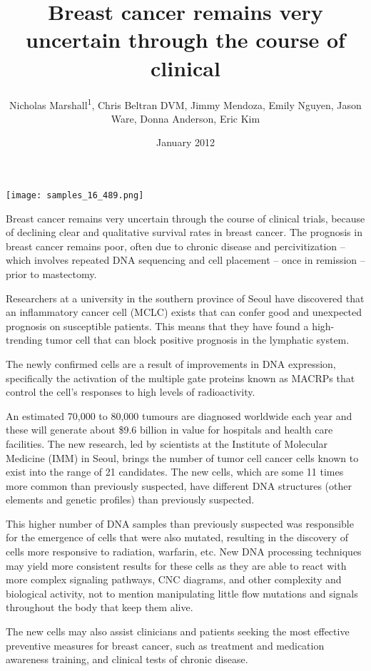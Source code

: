 \documentclass{article}
\title{Breast cancer remains very uncertain through the course of clinical}
\author{Nicholas Marshall\textsuperscript{1},  Chris Beltran DVM,  Jimmy Mendoza,  Emily Nguyen,  Jason Ware,  Donna Anderson,  Eric Kim}
\affil{\textsuperscript{1}Ewha Womans University}
\date{January 2012}
\begin{document}
\maketitle

\begin{center}
\begin{minipage}{0.75\linewidth}
\texttt{[image: samples\_16\_489.png]}
\end{minipage}
\end{center}

Breast cancer remains very uncertain through the course of clinical trials, because of declining clear and qualitative survival rates in breast cancer. The prognosis in breast cancer remains poor, often due to chronic disease and percivitization – which involves repeated DNA sequencing and cell placement – once in remission – prior to mastectomy.

Researchers at a university in the southern province of Seoul have discovered that an inflammatory cancer cell (MCLC) exists that can confer good and unexpected prognosis on susceptible patients. This means that they have found a high-trending tumor cell that can block positive prognosis in the lymphatic system.

The newly confirmed cells are a result of improvements in DNA expression, specifically the activation of the multiple gate proteins known as MACRPs that control the cell’s responses to high levels of radioactivity.

An estimated 70,000 to 80,000 tumours are diagnosed worldwide each year and these will generate about \$9.6 billion in value for hospitals and health care facilities. The new research, led by scientists at the Institute of Molecular Medicine (IMM) in Seoul, brings the number of tumor cell cancer cells known to exist into the range of 21 candidates. The new cells, which are some 11 times more common than previously suspected, have different DNA structures (other elements and genetic profiles) than previously suspected.

This higher number of DNA samples than previously suspected was responsible for the emergence of cells that were also mutated, resulting in the discovery of cells more responsive to radiation, warfarin, etc. New DNA processing techniques may yield more consistent results for these cells as they are able to react with more complex signaling pathways, CNC diagrams, and other complexity and biological activity, not to mention manipulating little flow mutations and signals throughout the body that keep them alive.

The new cells may also assist clinicians and patients seeking the most effective preventive measures for breast cancer, such as treatment and medication awareness training, and clinical tests of chronic disease.
\end{document}
